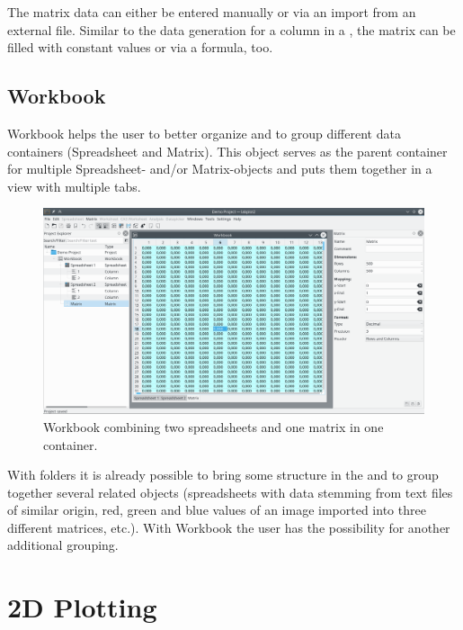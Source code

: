 The matrix data can either be entered manually or via an import from an external file.
Similar to the data generation for a column in a , the matrix can be filled with constant values or via a formula, too.


\section{Workbook}\label{sec:workbook}
Workbook helps the user to better organize and to group different data containers (Spreadsheet and Matrix).
This object serves as the parent container for multiple Spreadsheet- and/or Matrix-objects and puts them together in a view with multiple tabs.
\begin{figure}
\includegraphics[width=\textwidth]{images/workbook.png}
\caption{Workbook combining two spreadsheets and one matrix in one container.}
\end{figure}

With folders it is already possible to bring some structure in the  and to group together several related objects
(spreadsheets with data stemming from text files of similar origin, red, green and blue values of an image imported into three different matrices, etc.).
With Workbook the user has the possibility for another additional grouping.


\chapter{2D Plotting}\label{ch:2d_plotting}
